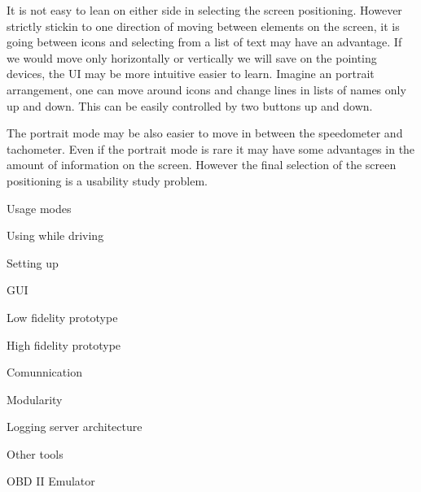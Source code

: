 It is not easy to lean on either side in selecting the screen positioning. However strictly stickin to one direction of moving between elements on the screen, it is going between icons and selecting from a list of text may have an advantage. If we would move only horizontally or vertically we will save on the pointing devices, the UI may be more intuitive easier to learn. Imagine an portrait arrangement, one can move around icons and change lines in lists of names only up and down. This can be easily controlled by two buttons up and down. 

The portrait mode may be also easier to move in between the speedometer and tachometer. Even if the portrait mode is rare it may have some advantages in the amount of information on the screen. However the final selection of the screen positioning is a usability study problem. 

\secc Usage modes 


\seccc Using while driving

\seccc Setting up

\sec GUI

\secc Low fidelity prototype

\secc High fidelity prototype

\sec Comunnication 

\sec Modularity

\sec Logging server architecture

\sec Other tools

\secc OBD II Emulator


